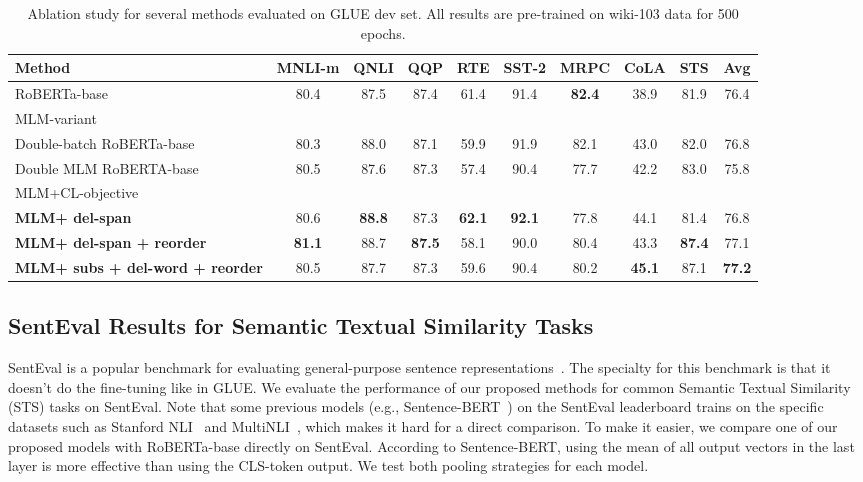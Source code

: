 \documentclass[11pt,a4paper]{article}
\begin{document}
\begin{table*}[t]
\caption{Ablation study for several methods evaluated on GLUE dev set. All results are pre-trained on wiki-103 data for 500 epochs.}
\label{tab:dis}
\centering
\setlength{\tabcolsep}{8pt}
\renewcommand{\arraystretch}{1.2}
\begin{adjustbox}{max width=\textwidth}
\begin{tabular}{l c c c c c c c c c}  \toprule
Method & MNLI-m & QNLI & QQP & RTE & SST-2 & MRPC & CoLA & STS & Avg \\
\midrule
RoBERTa-base & 80.4 & 87.5 & 87.4 & 61.4 & 91.4 & \textbf{82.4} & 38.9 & 81.9 & 76.4 \\
\midrule
MLM-variant & & & & & & & & & \\
Double-batch RoBERTa-base & 80.3 & 88.0 & 87.1 & 59.9 & 91.9 & 82.1 & 43.0 & 82.0 & 76.8 \\
Double MLM RoBERTA-base & 80.5 & 87.6 & 87.3 & 57.4 & 90.4 & 77.7 & 42.2 & 83.0 & 75.8\\
\midrule
MLM+CL-objective & & & & & & & & & \\
\textbf{MLM+ del-span} & 80.6 & \textbf{88.8} & 87.3 & \textbf{62.1} & \textbf{92.1} & 77.8 & 44.1 & 81.4 & 76.8\\
\textbf{MLM+ del-span + reorder} & \textbf{81.1} & 88.7 & \textbf{87.5} & 58.1 & 90.0 & 80.4 & 43.3 & \textbf{87.4} & 77.1\\
\textbf{MLM+ subs + del-word + reorder} & 80.5 & 87.7 & 87.3 & 59.6 & 90.4 & 80.2 & \textbf{45.1} & 87.1 & \textbf{77.2}\\
\bottomrule
\end{tabular}

\end{adjustbox}
\end{table*}
 \subsection{SentEval Results for Semantic Textual Similarity Tasks} \label{exp-senteval}
SentEval is a popular benchmark for evaluating general-purpose sentence representations~\cite{conneau2018senteval}. The specialty for this benchmark is that it doesn't do the fine-tuning like in GLUE. We evaluate the performance of our proposed methods for common  Semantic Textual Similarity (STS) tasks on SentEval. 
Note that some previous models (e.g., Sentence-BERT~\cite{reimers2019sentence}) on the SentEval leaderboard trains on the specific datasets such as Stanford NLI~\cite{bowman2015large} and MultiNLI~\cite{williams2017broad}, which makes it hard for a direct comparison. To make it easier, we compare one of our proposed models with RoBERTa-base directly on SentEval. According to Sentence-BERT, using the mean of all output vectors in the last layer is more effective than using the CLS-token output. We test both pooling strategies for each model. 
\end{document}
